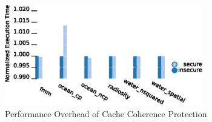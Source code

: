 \begin{figure}
    \begin{center}
        \includegraphics[width=3.4in]{figs/SPLASH.eps}
        \caption{Performance Overhead of Cache Coherence Protection}
        \label{fig:splash2}
    \end{center}
\end{figure}
